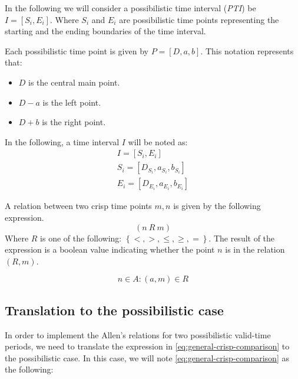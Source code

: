 \documentclass{llncs}
\begin{document}
In the following we will consider a possibilistic time interval (\emph{PTI}) be $I = \left[S_i, E_i \right]$. Where $S_i$ and $E_i$ are possibilistic time points representing the starting and the ending boundaries of the time interval.

Each possibilistic time point is given by $P = \left[D, a, b \right]$. This notation represents that:
\begin{itemize}
 \item $D$ is the central main point.
\item $D-a$ is the left point.
\item $D+b$ is the right point.
\end{itemize}
 
In the following, a time interval $I$ will be noted as:
\begin{align}
 I = \left[S_i, E_i \right]\\
S_i = \left[D_{S_i},a_{S_i},b_{S_i} \right] \\
E_i = \left[D_{E_i},a_{E_i},b_{E_i} \right]
\end{align}


A relation between two crisp time points $m, n$ is given by the following expression.
\begin{equation}
\label{eq:general-crisp-comparison}
\left(n\  R \  m \right) 
\end{equation}
Where  $R$ is one of the following: $\left \lbrace <, >, \leq, \geq, = \right \rbrace$.
The result of the expression is a boolean value indicating whether the point $n$ is in the relation $\left( R, m \right)$.

\begin{equation}
\label{eq:boolean-crisp-comparison}
n \in A:\left(a, m \right) \in R
\end{equation}

\subsection{\label{subsec:translation}Translation to the possibilistic case}
In order to implement the Allen's relations for two possibilistic valid-time periods, we need to translate the expression in \eqref{eq:general-crisp-comparison} to the possibilistic case. In this case, we will note \eqref{eq:general-crisp-comparison} as the following:
\end{document}

